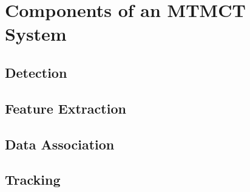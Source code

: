 \section{Components of an MTMCT System}\label{sec:components_of_an_mtmct_system}

\subsection{Detection}\label{subsec:detection}

\subsection{Feature Extraction}\label{subsec:feature_extraction}

\subsection{Data Association}\label{subsec:data_association}

\subsection{Tracking}\label{subsec:tracking}
